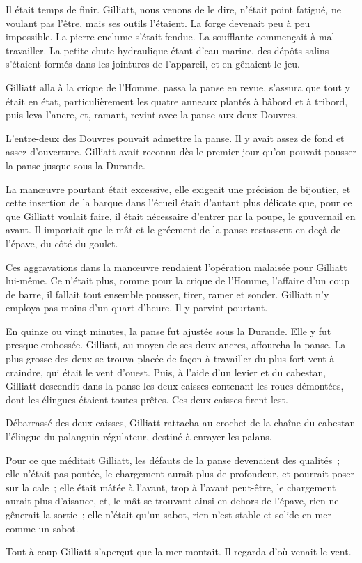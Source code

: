\documentclass[french,twoside]{book} %
\begin{document}
Il était temps de finir. Gilliatt, nous venons de le dire, n’était point fatigué, ne voulant pas l’être, mais ses outils l’étaient. La forge devenait peu à peu impossible. La pierre enclume s’était fendue. La soufflante commençait à mal travailler. La petite chute  hydraulique étant d’eau marine, des dépôts salins s’étaient formés dans les jointures de l’appareil, et en gênaient le jeu.\par
Gilliatt alla à la crique de l’Homme, passa la panse en revue, s’assura que tout y était en état, particulièrement les quatre anneaux plantés à bâbord et à tribord, puis leva l’ancre, et, ramant, revint avec la panse aux deux Douvres.\par
L’entre-deux des Douvres pouvait admettre la panse. Il y avait assez de fond et assez d’ouverture. Gilliatt avait reconnu dès le premier jour qu’on pouvait pousser la panse jusque sous la Durande.\par
La manœuvre pourtant était excessive, elle exigeait une précision de bijoutier, et cette insertion de la barque dans l’écueil était d’autant plus délicate que, pour ce que Gilliatt voulait faire, il était nécessaire d’entrer par la poupe, le gouvernail en avant. Il importait que le mât et le gréement de la panse restassent en deçà de l’épave, du côté du goulet.\par
Ces aggravations dans la manœuvre rendaient l’opération malaisée pour Gilliatt lui-même. Ce n’était plus, comme pour la crique de l’Homme, l’affaire d’un coup de barre, il fallait tout ensemble pousser, tirer, ramer et sonder. Gilliatt n’y employa pas moins d’un quart d’heure. Il y parvint pourtant.\par
En quinze ou vingt minutes, la panse fut ajustée sous la Durande. Elle y fut presque embossée. Gilliatt, au moyen de ses deux ancres, affourcha la panse. La plus grosse des deux se trouva placée de façon à travailler du plus fort vent à craindre, qui était le vent  d’ouest. Puis, à l’aide d’un levier et du cabestan, Gilliatt descendit dans la panse les deux caisses contenant les roues démontées, dont les élingues étaient toutes prêtes. Ces deux caisses firent lest.\par
Débarrassé des deux caisses, Gilliatt rattacha au crochet de la chaîne du cabestan l’élingue du palanguin régulateur, destiné à enrayer les palans.\par
Pour ce que méditait Gilliatt, les défauts de la panse devenaient des qualités ; elle n’était pas pontée, le chargement aurait plus de profondeur, et pourrait poser sur la cale ; elle était mâtée à l’avant, trop à l’avant peut-être, le chargement aurait plus d’aisance, et, le mât se trouvant ainsi en dehors de l’épave, rien ne gênerait la sortie ; elle n’était qu’un sabot, rien n’est stable et solide en mer comme un sabot.\par
Tout à coup Gilliatt s’aperçut que la mer montait. Il regarda d’où venait le vent.
\end{document}
